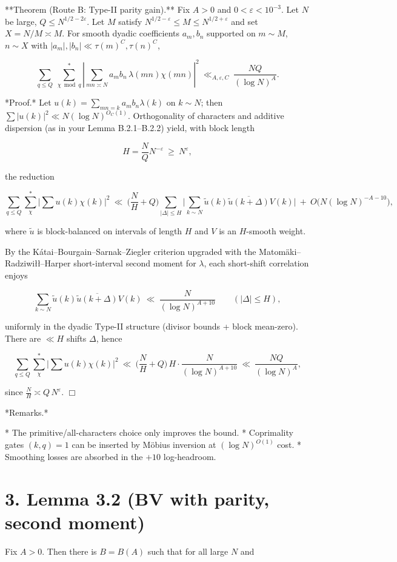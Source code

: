 \documentclass[11pt]{article}
\theoremstyle{definition}
\theoremstyle{remark}
\begin{document}
**Theorem (Route B: Type-II parity gain).**
Fix $A>0$ and $0<\varepsilon<10^{-3}$. Let $N$ be large, $Q\le N^{1/2-2\varepsilon}$. Let $M$ satisfy $N^{1/2-\varepsilon}\le M\le N^{1/2+\varepsilon}$ and set $X=N/M\asymp M$. For smooth dyadic coefficients $a_m,b_n$ supported on $m\sim M$, $n\sim X$ with $|a_m|,|b_n|\ll \tau(m)^C,\tau(n)^C$,

$$
\sum_{q\le Q}\ \sum_{\chi\bmod q}^{\!*}
\left|\sum_{mn\asymp N} a_m b_n\,\lambda(mn)\chi(mn)\right|^2
\ \ll_{A,\varepsilon,C}\ \frac{NQ}{(\log N)^{A}}.
$$

*Proof.* Let $u(k)=\sum_{mn=k}a_m b_n \lambda(k)$ on $k\sim N$; then $\sum |u(k)|^2\ll N(\log N)^{O_C(1)}$. Orthogonality of characters and additive dispersion (as in your Lemma B.2.1–B.2.2) yield, with block length

$$
H=\frac{N}{Q}N^{-\varepsilon}\ \ge\ N^{\varepsilon},
$$

the reduction

$$
\sum_{q\le Q}\sum_{\chi}^{*}\Big|\sum u(k)\chi(k)\Big|^2
\ \ll\ \Big(\frac{N}{H}+Q\Big)\!
\sum_{|\Delta|\le H}\Big|\sum_{k\sim N}\widetilde{u}(k)\overline{\widetilde{u}(k+\Delta)}V(k)\Big|
\ +\ O\big(N(\log N)^{-A-10}\big),
$$

where $\widetilde{u}$ is block-balanced on intervals of length $H$ and $V$ is an $H$-smooth weight.

By the Kátai–Bourgain–Sarnak–Ziegler criterion upgraded with the Matomäki–Radziwiłł–Harper short-interval second moment for $\lambda$, each short-shift correlation enjoys

$$
\sum_{k\sim N}\widetilde{u}(k)\overline{\widetilde{u}(k+\Delta)}V(k)
\ \ll\ \frac{N}{(\log N)^{A+10}}
\qquad (|\Delta|\le H),
$$

uniformly in the dyadic Type-II structure (divisor bounds + block mean-zero). There are $\ll H$ shifts $\Delta$, hence

$$
\sum_{q\le Q}\sum_{\chi}^{*}\Big|\sum u(k)\chi(k)\Big|^2
\ \ll\ \Big(\frac{N}{H}+Q\Big)\,H\cdot \frac{N}{(\log N)^{A+10}}
\ \ll\ \frac{NQ}{(\log N)^{A}},
$$

since $\frac{N}{H}\asymp Q\,N^{\varepsilon}$. $\Box$

*Remarks.*

* The primitive/all-characters choice only improves the bound.
* Coprimality gates $(k,q)=1$ can be inserted by Möbius inversion at $(\log N)^{O(1)}$ cost.
* Smoothing losses are absorbed in the $+10$ log-headroom.


\section*{3. Lemma 3.2 (BV with parity, second moment)}
Fix $A>0$. Then there is $B=B(A)$ such that for all large $N$ and
\end{document}
